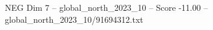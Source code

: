 \begin{textsample}{NEG Dim 7 – global\_north\_2023\_10 – Score -11.00 – global\_north\_2023\_10/91694312.txt}
\end{textsample}
